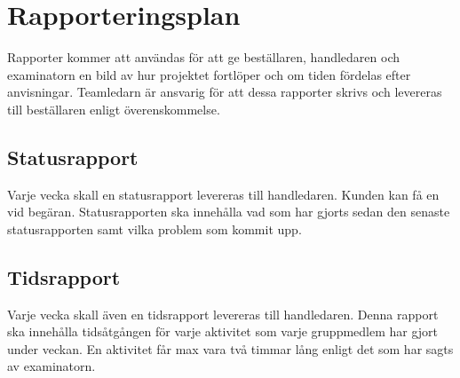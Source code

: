 \section{Rapporteringsplan}
Rapporter kommer att användas för att ge beställaren, handledaren och examinatorn en bild av hur projektet fortlöper och om tiden fördelas efter anvisningar. Teamledarn är ansvarig för att dessa rapporter skrivs och levereras till beställaren enligt överenskommelse.

\subsection{Statusrapport}
Varje vecka skall en statusrapport levereras till handledaren. Kunden kan få en vid begäran. Statusrapporten ska innehålla vad som har gjorts sedan den senaste statusrapporten samt vilka problem som kommit upp.

\subsection{Tidsrapport}
Varje vecka skall även en tidsrapport levereras till handledaren. Denna rapport ska innehålla tidsåtgången för varje aktivitet som varje gruppmedlem har gjort under veckan. En aktivitet får max vara två timmar lång enligt det som har sagts av examinatorn. 
